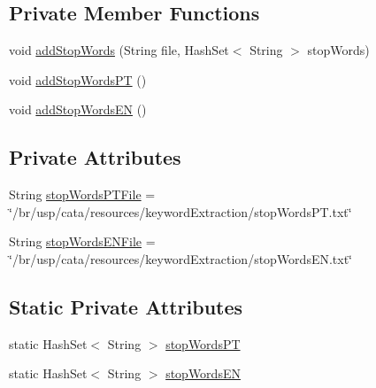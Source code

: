 \subsection*{Private Member Functions}
\begin{DoxyCompactItemize}
\item 
void \hyperlink{classbr_1_1usp_1_1cata_1_1component_1_1keyword_extraction_1_1_stop_words_ad8c1cd30f12596bd0d5dab9ffbc6b3a6}{add\+Stop\+Words} (String file, Hash\+Set$<$ String $>$ stop\+Words)
\item 
void \hyperlink{classbr_1_1usp_1_1cata_1_1component_1_1keyword_extraction_1_1_stop_words_a402bfa496ee3ce539afc8556a56dd4d4}{add\+Stop\+Words\+P\+T} ()
\item 
void \hyperlink{classbr_1_1usp_1_1cata_1_1component_1_1keyword_extraction_1_1_stop_words_a0b3fdee7a14a06032fdebe515e9ff9b1}{add\+Stop\+Words\+E\+N} ()
\end{DoxyCompactItemize}
\subsection*{Private Attributes}
\begin{DoxyCompactItemize}
\item 
String \hyperlink{classbr_1_1usp_1_1cata_1_1component_1_1keyword_extraction_1_1_stop_words_a510f6cbec0ff0da13defd502448ffc21}{stop\+Words\+P\+T\+File} = \char`\"{}/br/usp/cata/resources/keyword\+Extraction/stop\+Words\+P\+T.\+txt\char`\"{}
\item 
String \hyperlink{classbr_1_1usp_1_1cata_1_1component_1_1keyword_extraction_1_1_stop_words_ae7faa48ee7bfeba3ae56fa605c3f64a1}{stop\+Words\+E\+N\+File} = \char`\"{}/br/usp/cata/resources/keyword\+Extraction/stop\+Words\+E\+N.\+txt\char`\"{}
\end{DoxyCompactItemize}
\subsection*{Static Private Attributes}
\begin{DoxyCompactItemize}
\item 
static Hash\+Set$<$ String $>$ \hyperlink{classbr_1_1usp_1_1cata_1_1component_1_1keyword_extraction_1_1_stop_words_af7f20647ee5e5a87e9a853aeb3fd082c}{stop\+Words\+P\+T}
\item 
static Hash\+Set$<$ String $>$ \hyperlink{classbr_1_1usp_1_1cata_1_1component_1_1keyword_extraction_1_1_stop_words_ab40186812209a954a47aa531fc92afd4}{stop\+Words\+E\+N}
\end{DoxyCompactItemize}



